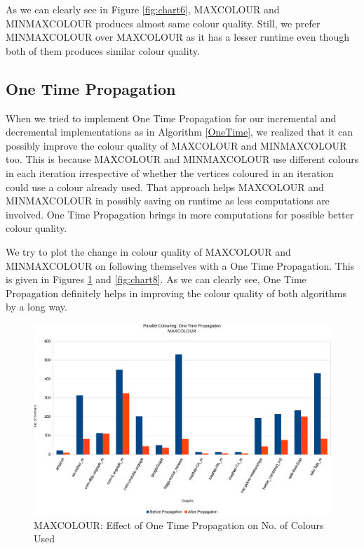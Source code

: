 \documentclass[MTech]{iitmdiss}
\begin{document}
As we can clearly see in Figure \ref{fig:chart6}, MAXCOLOUR and MINMAXCOLOUR produces almost same colour quality. Still, we prefer MINMAXCOLOUR over MAXCOLOUR as it has a lesser runtime even though both of them produces similar colour quality.

\subsection{One Time Propagation}
When we tried to implement One Time Propagation for our incremental and decremental implementations as in Algorithm \ref{OneTime}, we realized that it can possibly improve the colour quality of MAXCOLOUR and MINMAXCOLOUR too. This is because MAXCOLOUR and MINMAXCOLOUR use different colours in each iteration irrespective of whether the vertices coloured in an iteration could use a colour already used. That approach helps MAXCOLOUR and MINMAXCOLOUR in possibly saving on runtime as less computations are involved. One Time Propagation brings in more computations for possible better colour quality.

We try to plot the change in colour quality of MAXCOLOUR and MINMAXCOLOUR on following themselves with a One Time Propagation. This is given in Figures \ref{fig:chart7} and \ref{fig:chart8}. As we can clearly see, One Time Propagation definitely helps in improving the colour quality of both algorithms by a long way. 

\begin{figure}[h]
    \centering
    \includegraphics[width=\textwidth,keepaspectratio=true]{chartNewest7.pdf}
    \caption{
        MAXCOLOUR: Effect of One Time Propagation on No. of Colours Used
    }
    \label{fig:chart7}
\end{figure}
\end{document}
